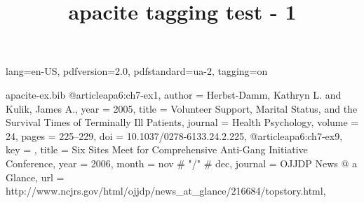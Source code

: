 \DocumentMetadata
  {
    lang=en-US,
    pdfversion=2.0,
    pdfstandard=ua-2,
    tagging=on
  }
\begin{filecontents}[noheader]{apacite-ex.bib}
@article{apa6:ch7-ex1,
  author  = {Herbst-Damm, Kathryn L. and Kulik, James A.},
  year    = {2005},
  title   = {Volunteer Support, Marital Status, and the Survival Times of
             Terminally Ill Patients},
  journal = {Health Psychology},
  volume  = {24},
  pages   = {225--229},
  doi     = {10.1037/0278-6133.24.2.225},
}
@article{apa6:ch7-ex9,
  key     = {{}},
  title   = {Six Sites Meet for Comprehensive Anti-Gang
             Initiative Conference},
  year    = {2006},
  month   = nov # "/" # dec,
  journal = {OJJDP News @ a Glance},
  url     =
    {http://www.ncjrs.gov/html/ojjdp/news_at_glance/216684/topstory.html},
}
\end{filecontents}

\documentclass{article}

\usepackage[mask]{apacite}
\usepackage{hyperref}

\title{apacite tagging test - 1}


\tableofcontents
\section{A section}

\cite<e.g.,>[p.~11]{apa6:ch7-ex1,apa6:ch7-ex9}

\citeA<e.g.,>[p.~11]{apa6:ch7-ex1,apa6:ch7-ex9}

\citeauthor<e.g.,>[p.~11]{apa6:ch7-ex1,apa6:ch7-ex9}

\citeyear<e.g.,>[p.~11]{apa6:ch7-ex1,apa6:ch7-ex9}

\citeyearNP<e.g.,>[p.~11]{apa6:ch7-ex1,apa6:ch7-ex9}

\citeNP<e.g.,>[p.~11]{apa6:ch7-ex1,apa6:ch7-ex9}

\fullcite<e.g.,>[p.~11]{apa6:ch7-ex1,apa6:ch7-ex9}

\shortcite<e.g.,>[p.~11]{apa6:ch7-ex1,apa6:ch7-ex9}

\maskcite<e.g.,>[p.~11]{apa6:ch7-ex1,apa6:ch7-ex9}




